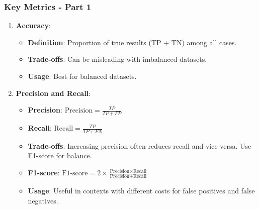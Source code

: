 \documentclass[aspectratio=169]{beamer}
\begin{document}
\begin{frame}[fragile]
    \frametitle{Key Metrics - Part 1}
    \begin{enumerate}
        \item \textbf{Accuracy}:
        \begin{itemize}
            \item \textbf{Definition}: Proportion of true results (TP + TN) among all cases.
            \item \textbf{Trade-offs}: Can be misleading with imbalanced datasets.
            \item \textbf{Usage}: Best for balanced datasets.
        \end{itemize}
        
        \item \textbf{Precision and Recall}:
        \begin{itemize}
            \item \textbf{Precision}: \(\text{Precision} = \frac{TP}{TP + FP}\) 
            \item \textbf{Recall}: \(\text{Recall} = \frac{TP}{TP + FN}\) 
            \item \textbf{Trade-offs}: Increasing precision often reduces recall and vice versa. Use F1-score for balance.
            \item \textbf{F1-score}: \(\text{F1-score} = 2 \times \frac{\text{Precision} \times \text{Recall}}{\text{Precision} + \text{Recall}}\)  
            \item \textbf{Usage}: Useful in contexts with different costs for false positives and false negatives.
        \end{itemize}
    \end{enumerate}
\end{frame}
\end{document}
